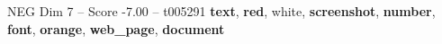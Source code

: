 \begin{textsample}{NEG Dim 7 – Score -7.00 – t005291}  \label{ex:f7_neg_036}
\textbf{text}, \textbf{red}, white, \textbf{screenshot}, \textbf{number}, \textbf{font}, \textbf{orange}, \textbf{web\_page}, \textbf{document}

\end{textsample}

